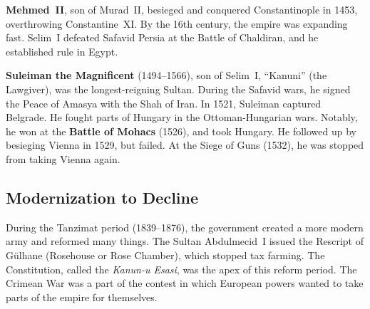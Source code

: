 \textbf{Mehmed~II}, son of Murad~II, besieged and conquered Constantinople in 1453, overthrowing Constantine~XI\@.
By the 16th century, the empire was expanding fast.
Selim~I defeated Safavid Persia at the Battle of Chaldiran, and he established rule in Egypt.

\textbf{Suleiman the Magnificent} (1494--1566), son of Selim~I, ``Kanuni'' (the Lawgiver),
was the longest-reigning Sultan.
During the Safavid wars, he signed the Peace of Amasya with the Shah of Iran.
In 1521, Suleiman captured Belgrade.
He fought parts of Hungary in the Ottoman-Hungarian wars.
Notably, he won at the \textbf{Battle of Mohacs} (1526), and took Hungary.
He followed up by besieging Vienna in 1529, but failed.
At the Siege of Guns (1532), he was stopped from taking Vienna again.

\subsection*{Modernization to Decline}

During the Tanzimat period (1839--1876), the government created a more modern army and reformed many things.
The Sultan Abdulmecid~I issued the Rescript of G\"ulhane (Rosehouse or Rose Chamber), which stopped tax farming.
The Constitution, called the \textit{Kanun-u Esasi}, was the apex of this reform period.
The Crimean War was a part of the contest in which European powers wanted to take parts of the empire for themselves.
